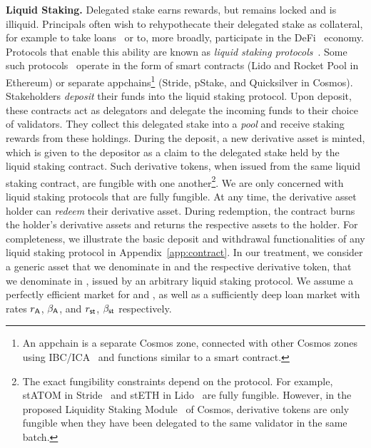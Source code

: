 \noindent
\textbf{Liquid Staking.} Delegated stake earns rewards, but remains locked and
is illiquid. Principals often wish to rehypothecate their delegated stake as collateral,
for example to take loans~\cite{gudgeon2020defi} or to, more broadly, participate in the
DeFi~\cite{defi-sok} economy. Protocols that enable this ability are known as
\emph{liquid staking protocols}~\cite{liquid-staking-report}.
Some such protocols~\cite{lido,stride} operate
in the form of smart contracts (\eg Lido and Rocket Pool in Ethereum) or separate
appchains\footnote{An appchain is a separate Cosmos zone, connected with other
Cosmos zones using IBC/ICA~\cite{ibc-ica} and functions similar to a smart contract.}
(\eg Stride, pStake, and Quicksilver in Cosmos).
Stakeholders \emph{deposit} their funds into the liquid staking protocol.
Upon deposit, these contracts act as
delegators and delegate the incoming funds to their choice of validators.
They collect this delegated stake into a \emph{pool} and receive staking
rewards from these holdings.
During the deposit, a new derivative asset is minted,
which is given to the depositor as a claim to the delegated stake held by the
liquid staking contract. Such derivative tokens, when issued from the same liquid
staking contract, are fungible with one another\footnote{The exact fungibility
constraints depend on the protocol. For example,
\textsf{stATOM} in Stride~\cite{stride} and \textsf{stETH} in Lido~\cite{lido} are fully fungible.
However, in the proposed Liquidity Staking
Module~\cite{liquidity-staking-module} of Cosmos,
derivative tokens are only fungible when they have been
delegated to the same validator in the same batch.}. We are only concerned with liquid
staking protocols that are fully fungible. At any time, the derivative asset holder
can \emph{redeem} their derivative asset.
During redemption, the contract burns
the holder's derivative assets and returns the respective assets to the holder.
For completeness, we illustrate the basic deposit and withdrawal
functionalities of any liquid staking protocol in Appendix~\ref{app:contract}.
In our treatment, we consider a generic asset that we denominate in \asset
and the respective derivative token, that we denominate in \stasset,
issued by an arbitrary liquid staking protocol.
We assume a perfectly efficient market for \asset and \stasset,
as well as a sufficiently deep loan market with rates
$r_{\textsf{A}}$, $\beta_{\textsf{A}}$, and $r_{\textsf{st}}$, $\beta_{\textsf{st}}$ respectively.

